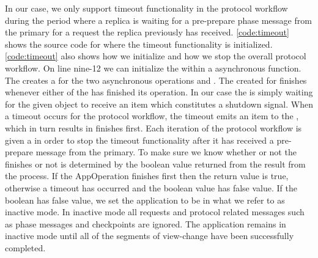 In our case, we only support timeout functionality in the protocol workflow during the period where a replica is waiting for a pre-prepare phase message from the primary for a request the replica previously has received. \autoref{code:timeout} shows the source code for where the timeout functionality is initialized. \autoref{code:timeout} also shows how we initialize and how we stop the overall protocol workflow. On line nine-12 we can initialize the  within a  asynchronous function. The  creates a  for the two asynchronous  operations  and . The  created for  finishes whenever either of the  has finished its operation. In our case the  is simply waiting for the given  object  to receive an item which constitutes a shutdown signal. When a timeout occurs for the protocol workflow, the timeout emits an item to the , which in turn results in  finishes first. Each iteration of the protocol workflow is given a  in order to stop the timeout functionality after it has received a pre-prepare message from the primary. To make sure we know whether or not the  finishes or not is determined by the boolean value returned from the  result from the  process. If the AppOperation finishes first then the return value is true, otherwise a timeout has occurred and the boolean value has false value.  If the boolean has false value, we set the application to be in what we refer to as inactive mode. In inactive mode all requests and protocol related messages such as phase messages and checkpoints are ignored. The application remains in inactive mode until all of the segments of view-change have been successfully completed. 

